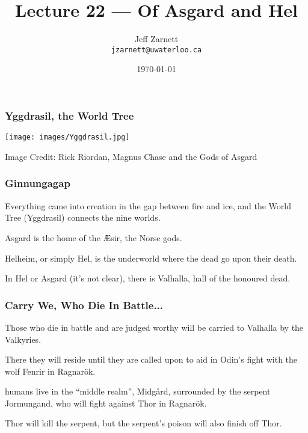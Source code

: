 

\title{Lecture 22 --- Of Asgard and Hel }

\author{Jeff Zarnett \\ \small \texttt{jzarnett@uwaterloo.ca}}
\date{\today}




\begin{frame}
	\titlepage

\end{frame}


\begin{frame}
	\frametitle{Yggdrasil, the World Tree}

	\begin{center}
		\texttt{[image: images/Yggdrasil.jpg]}
	\end{center}
	\hfill Image Credit: Rick Riordan, Magnus Chase and the Gods of Asgard
\end{frame}


\begin{frame}
	\frametitle{Ginnungagap}

	Everything came into creation in the gap between fire and ice, and the World Tree (Yggdrasil) connects the nine worlds.

	Asgard is the home of the \AE sir, the Norse gods.

	Helheim, or simply Hel, is the underworld where the dead go upon their death.

	In Hel or Asgard (it's not clear), there is Valhalla, hall of the honoured dead.

\end{frame}

\begin{frame}
	\frametitle{Carry We, Who Die In Battle...}

	Those who die in battle and are judged worthy will be carried to Valhalla by the Valkyries.

	There they will reside until they are called upon to aid in Odin's fight with the wolf Fenrir in Ragnar\"ok.

	humans live in the ``middle realm'', Midg\aa rd, surrounded by the serpent Jormungand, who will fight against Thor in  Ragnar\"ok.

	Thor will kill the serpent, but the serpent's poison will also finish off Thor.

\end{frame}

